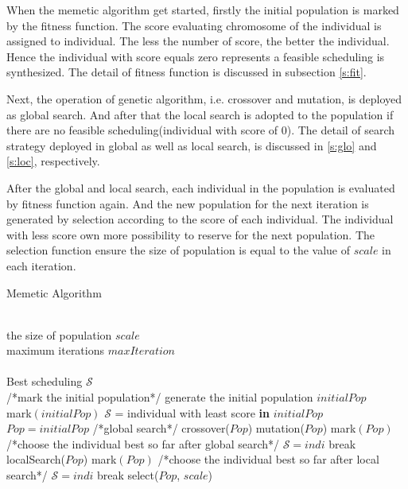 \documentclass[journal]{IEEEtran}
\newcommand{\calS}{\mathcal{S}}
\theoremstyle{remark}
\begin{document}
When the memetic algorithm get started, firstly the initial population is marked by the fitness function.
The score evaluating chromosome of the individual is assigned to individual.
The less the number of score, the better the individual.
Hence the individual with score equals zero represents a feasible scheduling is synthesized.
The detail of fitness function is discussed in subsection \ref{s:fit}.

Next, the operation of genetic algorithm,
 i.e. crossover and mutation,
  is deployed as global search.
And after that the local search is adopted to the population if there are no feasible scheduling(individual with score of 0).
The detail of search strategy deployed in global as well as local search, is discussed in \ref{s:glo} and \ref{s:loc}, respectively.

After the global and local search,
 each individual in the population is evaluated by fitness function again.
And the new population for the next iteration is generated by selection according to the score of each individual.
The individual with less score own more possibility to reserve for the next population.
The selection function ensure the size of population is equal to the value of $scale$ in each iteration.

\begin{algorithm}[tb]
	\caption{Memetic Algorithm}
	\renewcommand{\algorithmicrequire}{\textbf{Input:}}
	\renewcommand{\algorithmicensure}{\textbf{Output:}}
	\begin{algorithmic}[1]
		\REQUIRE~~\\
		the size of population $scale$\\
		maximum iterations $maxIteration$\\
		\ENSURE~~\\
		Best scheduling $\calS$\\
			\STATE /*mark the initial population*/
				\STATE generate the	initial population $initialPop$\\
				\STATE mark$(initialPop)$
				\STATE $\mathcal{S}$ = individual with least score \textbf{in} $initialPop$
				\STATE $Pop = initialPop$
			\ELSE
			\STATE /*global search*/
				\STATE crossover($Pop$)
				\STATE mutation($Pop$)
				\STATE mark$(Pop)$
			\ENDIF
			\STATE /*choose the individual best so far after global search*/
					\STATE $\mathcal{S}=indi$
				\ENDIF
					\STATE break
				\ENDIF
			\ENDFOR	
			\STATE localSearch($Pop$)
			\STATE mark$(Pop)$
			\STATE /*choose the individual best so far after local search*/
					\STATE $\mathcal{S}=indi$
				\ENDIF
					\STATE break
				\ENDIF
			\ENDFOR			
			\STATE select($Pop$, $scale$)
		\ENDFOR
	\end{algorithmic}
\end{algorithm}	
\end{document}
